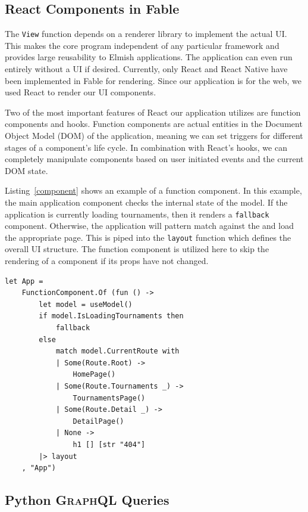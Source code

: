 \documentclass[sigconf]{acmart}
\begin{document}
\subsection{React Components in Fable}

The \texttt{View} function depends on a renderer library to implement the actual \textsc{UI}. This makes the core program independent of any particular framework and provides large reusability to Elmish applications. The application can even run entirely without a \textsc{UI} if desired. Currently, only React and React Native have been implemented in Fable for rendering. Since our application is for the web, we used React to render our \textsc{UI} components.

Two of the most important features of React our application utilizes are function components and hooks. Function components are actual entities in the Document Object Model (DOM) of the application, meaning we can set triggers for different stages of a component's life cycle. In combination with React's hooks, we can completely manipulate components based on user initiated events and the current DOM state. 

Listing~\ref{component} shows an example of a function component. In this example, the main application component checks the internal state of the model. If the application is currently loading tournaments, then it renders a \texttt{fallback} component. Otherwise, the application will pattern match against the  and load the appropriate page. This is piped into the \texttt{layout} function which defines the overall \textsc{UI} structure. The function component is utilized here to skip the rendering of a component if its props have not changed.

\begin{lstlisting}[caption=Function component example., label=component, captionpos=b]
let App =
    FunctionComponent.Of (fun () ->
        let model = useModel()
        if model.IsLoadingTournaments then
            fallback
        else
            match model.CurrentRoute with
            | Some(Route.Root) ->
                HomePage()
            | Some(Route.Tournaments _) ->
                TournamentsPage()
            | Some(Route.Detail _) ->
                DetailPage()
            | None ->
                h1 [] [str "404"]
        |> layout
    , "App")
\end{lstlisting}

\subsection{Python \textsc{GraphQL} Queries}
\end{document}
